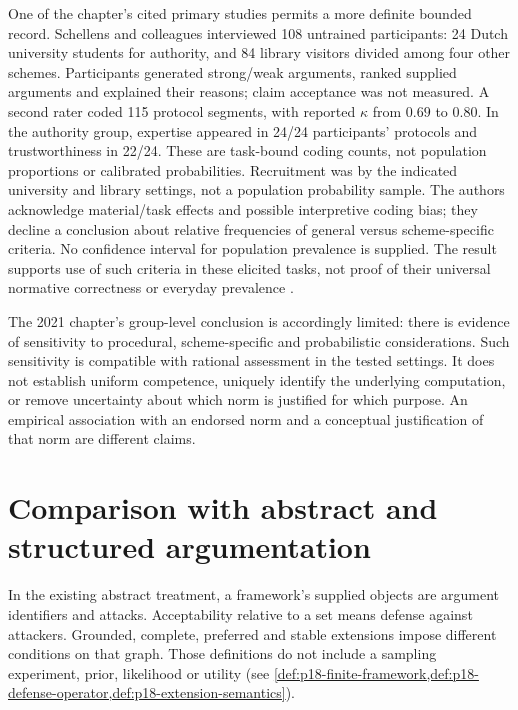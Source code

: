 One of the chapter's cited primary studies permits a more definite
bounded record. Schellens and colleagues interviewed 108 untrained
participants: 24 Dutch university students for authority, and 84 library
visitors divided among four other schemes. Participants generated
strong/weak arguments, ranked supplied arguments and explained their
reasons; claim acceptance was not measured. A second rater coded
115 protocol segments, with reported \(\kappa\) from \(0.69\)
to \(0.80\). In the authority group, expertise appeared in 24/24
participants' protocols and trustworthiness in 22/24. These are task-bound
coding counts, not population proportions or calibrated probabilities.
Recruitment was by the indicated university and library settings, not a
population probability sample. The authors acknowledge material/task effects and possible interpretive
coding bias; they decline a conclusion about relative frequencies of
general versus scheme-specific criteria. No confidence interval for
population prevalence is supplied. The result supports use of such
criteria in these elicited tasks, not proof of their universal normative
correctness or everyday prevalence
\cite[pp.~686--689, 697--700]{SchellensEtAl2017SchemeCriteria}.

The 2021 chapter's group-level conclusion is accordingly limited:
there is evidence of sensitivity to procedural, scheme-specific and
probabilistic considerations. Such sensitivity is compatible with
rational assessment in the tested settings. It does not establish
uniform competence, uniquely identify the underlying computation,
or remove uncertainty about which norm is justified for which purpose.
An empirical association with an endorsed norm and a conceptual
justification of that norm are different claims.

\section{Comparison with abstract and structured argumentation}

In the existing abstract treatment, a framework's supplied objects are
argument identifiers and attacks. Acceptability relative to a set means
defense against attackers. Grounded, complete, preferred and stable
extensions impose different conditions on that graph. Those definitions
do not include a sampling experiment, prior, likelihood or utility
(see \cref{def:p18-finite-framework,def:p18-defense-operator,def:p18-extension-semantics}).


